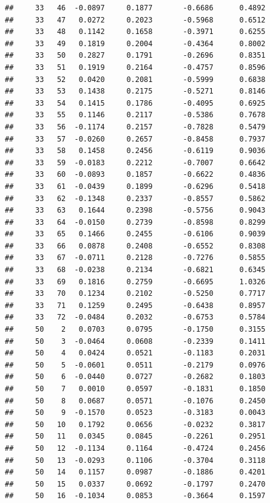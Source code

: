 \documentclass[
]{article}
\begin{document}
\begin{verbatim}
##     33   46  -0.0897     0.1877       -0.6686      0.4892 
##     33   47   0.0272     0.2023       -0.5968      0.6512 
##     33   48   0.1142     0.1658       -0.3971      0.6255 
##     33   49   0.1819     0.2004       -0.4364      0.8002 
##     33   50   0.2827     0.1791       -0.2696      0.8351 
##     33   51   0.1919     0.2164       -0.4757      0.8596 
##     33   52   0.0420     0.2081       -0.5999      0.6838 
##     33   53   0.1438     0.2175       -0.5271      0.8146 
##     33   54   0.1415     0.1786       -0.4095      0.6925 
##     33   55   0.1146     0.2117       -0.5386      0.7678 
##     33   56  -0.1174     0.2157       -0.7828      0.5479 
##     33   57  -0.0260     0.2657       -0.8458      0.7937 
##     33   58   0.1458     0.2456       -0.6119      0.9036 
##     33   59  -0.0183     0.2212       -0.7007      0.6642 
##     33   60  -0.0893     0.1857       -0.6622      0.4836 
##     33   61  -0.0439     0.1899       -0.6296      0.5418 
##     33   62  -0.1348     0.2337       -0.8557      0.5862 
##     33   63   0.1644     0.2398       -0.5756      0.9043 
##     33   64  -0.0150     0.2739       -0.8598      0.8299 
##     33   65   0.1466     0.2455       -0.6106      0.9039 
##     33   66   0.0878     0.2408       -0.6552      0.8308 
##     33   67  -0.0711     0.2128       -0.7276      0.5855 
##     33   68  -0.0238     0.2134       -0.6821      0.6345 
##     33   69   0.1816     0.2759       -0.6695      1.0326 
##     33   70   0.1234     0.2102       -0.5250      0.7717 
##     33   71   0.1259     0.2495       -0.6438      0.8957 
##     33   72  -0.0484     0.2032       -0.6753      0.5784 
##     50    2   0.0703     0.0795       -0.1750      0.3155 
##     50    3  -0.0464     0.0608       -0.2339      0.1411 
##     50    4   0.0424     0.0521       -0.1183      0.2031 
##     50    5  -0.0601     0.0511       -0.2179      0.0976 
##     50    6  -0.0440     0.0727       -0.2682      0.1803 
##     50    7   0.0010     0.0597       -0.1831      0.1850 
##     50    8   0.0687     0.0571       -0.1076      0.2450 
##     50    9  -0.1570     0.0523       -0.3183      0.0043 
##     50   10   0.1792     0.0656       -0.0232      0.3817 
##     50   11   0.0345     0.0845       -0.2261      0.2951 
##     50   12  -0.1134     0.1164       -0.4724      0.2456 
##     50   13  -0.0293     0.1106       -0.3704      0.3118 
##     50   14   0.1157     0.0987       -0.1886      0.4201 
##     50   15   0.0337     0.0692       -0.1797      0.2470 
##     50   16  -0.1034     0.0853       -0.3664      0.1597 

\end{verbatim}
\end{document}

